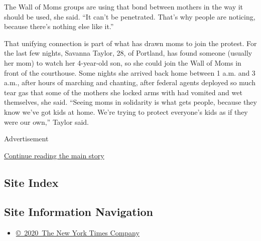 The Wall of Moms groups are using that bond between mothers in the way
it should be used, she said. ``It can't be penetrated. That's why people
are noticing, because there's nothing else like it.''

That unifying connection is part of what has drawn moms to join the
protest. For the last few nights, Savanna Taylor, 28, of Portland, has
found someone (usually her mom) to watch her 4-year-old son, so she
could join the Wall of Moms in front of the courthouse. Some nights she
arrived back home between 1 a.m. and 3 a.m., after hours of marching and
chanting, after federal agents deployed so much tear gas that some of
the mothers she locked arms with had vomited and wet themselves, she
said. ``Seeing moms in solidarity is what gets people, because they know
we've got kids at home. We're trying to protect everyone's kids as if
they were our own,'' Taylor said.

Advertisement

\protect\hyperlink{after-bottom}{Continue reading the main story}

\hypertarget{site-index}{%
\subsection{Site Index}\label{site-index}}

\hypertarget{site-information-navigation}{%
\subsection{Site Information
Navigation}\label{site-information-navigation}}

\begin{itemize}
\tightlist
\item
  \href{https://help.nytimes3xbfgragh.onion/hc/en-us/articles/115014792127-Copyright-notice}{©~2020~The
  New York Times Company}
\end{itemize}

